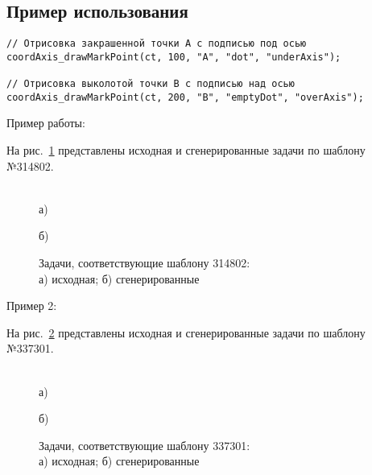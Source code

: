 \subsection{Пример использования}
\begin{verbatim}
// Отрисовка закрашенной точки A с подписью под осью
coordAxis_drawMarkPoint(ct, 100, "A", "dot", "underAxis");

// Отрисовка выколотой точки B с подписью над осью
coordAxis_drawMarkPoint(ct, 200, "B", "emptyDot", "overAxis");
\end{verbatim}

Пример работы:
 

На рис.~\ref{ris:314802} представлены исходная и сгенерированные задачи по шаблону №314802.

\begin{figure}[H]
\begin{minipage}[H]{0.95\linewidth}
 \\а)
\end{minipage}
\vfill
\begin{minipage}[H]{0.95\linewidth}
 б) \\
\end{minipage}
\caption{Задачи, соответствующие шаблону 314802:
\\
а) исходная; б) сгенерированные}
\label{ris:314802}
\end{figure}

Пример 2:
 
На рис.~\ref{ris:337301} представлены исходная и сгенерированные задачи по шаблону №337301.
\begin{figure}[h]
\begin{minipage}[h]{0.95\linewidth}
 \\а)
\end{minipage}
\vfill
\begin{minipage}[h]{0.95\linewidth}
 б) \\
\end{minipage}
\caption{Задачи, соответствующие шаблону 337301:
\\
а) исходная; б) сгенерированные}
\label{ris:337301}
\end{figure}




